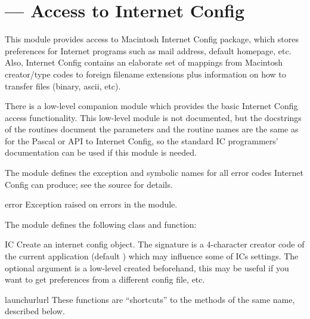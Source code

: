 \section{ ---
         Access to Internet Config}



This module provides access to Macintosh Internet
Config package,
which stores preferences for Internet programs such as mail address,
default homepage, etc. Also, Internet Config contains an elaborate set
of mappings from Macintosh creator/type codes to foreign filename
extensions plus information on how to transfer files (binary, ascii,
etc).

There is a low-level companion module
 which provides the basic
Internet Config access functionality.  This low-level module is not
documented, but the docstrings of the routines document the parameters
and the routine names are the same as for the Pascal or \C{} API to
Internet Config, so the standard IC programmers' documentation can be
used if this module is needed.

The  module defines the  exception and
symbolic names for all error codes Internet Config can produce; see
the source for details.

\begin{excdesc}{error}
Exception raised on errors in the  module.
\end{excdesc}


The  module defines the following class and function:

\begin{classdesc}{IC}{}
Create an internet config object. The signature is a 4-character creator
code of the current application (default ) which may
influence some of ICs settings. The optional  argument is a
low-level  created beforehand, this may be
useful if you want to get preferences from a different config file,
etc.
\end{classdesc}

\begin{funcdesc}{launchurl}{url}
These functions are ``shortcuts'' to the methods of the same name,
described below.
\end{funcdesc}



